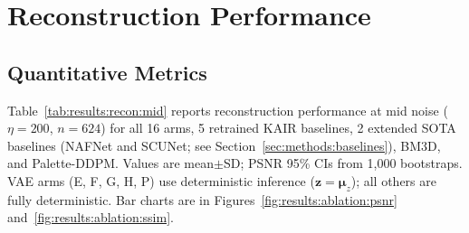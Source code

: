 \documentclass[12pt, a4paper, twoside, openright]{book}
\begin{document}
\begin{table}[htbp]
\end{table}

\section{Reconstruction Performance}
\label{sec:results:recon}

\subsection{Quantitative Metrics}
\label{sec:results:recon:quant}

Table~\ref{tab:results:recon:mid} reports reconstruction performance at mid noise ($\eta=200$, $n=624$) for all 16 arms, 5 retrained KAIR baselines, 2 extended SOTA baselines (NAFNet and SCUNet; see Section~\ref{sec:methods:baselines}), BM3D, and Palette-DDPM. Values are mean$\pm$SD; PSNR 95\% CIs from 1,000 bootstraps. VAE arms (E, F, G, H, P) use deterministic inference ($\mathbf{z}=\boldsymbol{\mu}_z$); all others are fully deterministic. Bar charts are in Figures~\ref{fig:results:ablation:psnr} and~\ref{fig:results:ablation:ssim}.
\end{document}
